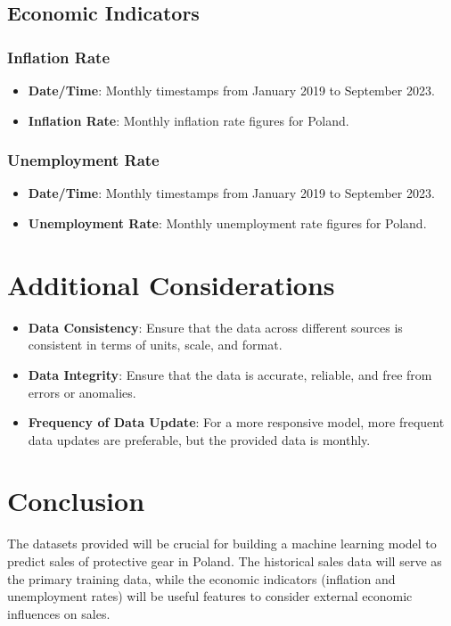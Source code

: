 \documentclass{article}
\begin{document}
\subsection{Economic Indicators}

\subsubsection{Inflation Rate}
\begin{itemize}
    \item \textbf{Date/Time}: Monthly timestamps from January 2019 to September 2023.
    \item \textbf{Inflation Rate}: Monthly inflation rate figures for Poland.
\end{itemize}

\subsubsection{Unemployment Rate}
\begin{itemize}
    \item \textbf{Date/Time}: Monthly timestamps from January 2019 to September 2023.
    \item \textbf{Unemployment Rate}: Monthly unemployment rate figures for Poland.
\end{itemize}


\section{Additional Considerations}
\begin{itemize}
    \item \textbf{Data Consistency}: Ensure that the data across different sources is consistent in terms of units, scale, and format.
    \item \textbf{Data Integrity}: Ensure that the data is accurate, reliable, and free from errors or anomalies.
    \item \textbf{Frequency of Data Update}: For a more responsive model, more frequent data updates are preferable, but the provided data is monthly.
\end{itemize}

\section{Conclusion}
The datasets provided will be crucial for building a machine learning model to predict sales of protective gear in Poland. The historical sales data will serve as the primary training data, while the economic indicators (inflation and unemployment rates) will be useful features to consider external economic influences on sales.
\end{document}
